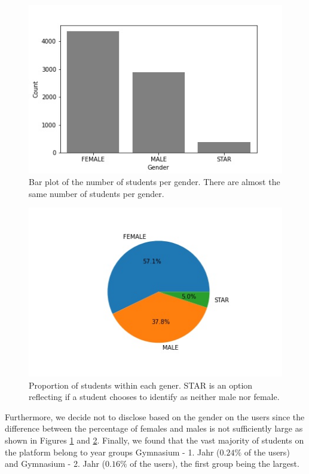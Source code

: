 \documentclass[sigplan,screen]{acmart}
\begin{document}
\begin{figure}[h]
    \centering
    \includegraphics[width=\linewidth]{reports/figures/num_per_gender.jpg}
    \caption{Bar plot of the number of students per gender. There are almost the same number of students per gender.}
    \label{fig:gender}
\end{figure}

\begin{figure}[h]
    \centering
    \includegraphics[width=\linewidth]{reports/figures/pie_chart.jpg}
    \caption{Proportion of students within each gener. STAR is an option reflecting if a student chooses to identify as neither male nor female.}
    \label{fig:pie_chart}
\end{figure}

Furthermore, we decide not to disclose based on the gender on the users since the difference between the percentage of females and males is not sufficiently large as shown in Figures \ref{fig:gender} and \ref{fig:pie_chart}. Finally, we found that the vast majority of students on the platform belong to year groups Gymnasium - 1. Jahr ($0.24 \%$ of the users) and Gymnasium - 2. Jahr ($0.16 \%$ of the users), the first group being the largest.
\end{document}
